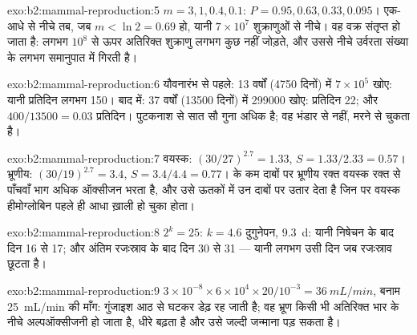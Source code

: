 \begin{solution}{exo:b2:mammal-reproduction:5}
$m = 3, 1, 0.4, 0.1$: $P = 0.95, 0.63, 0.33, 0.095$। एक-आधे से नीचे तब,
जब $m < \ln 2 = 0.69$ हो, यानी $7\times 10^{7}$ शुक्राणुओं से नीचे। वह
वक्र संतृप्त हो जाता है: लगभग $10^{8}$ से ऊपर अतिरिक्त शुक्राणु लगभग कुछ
नहीं जोड़ते, और उससे नीचे उर्वरता संख्या के लगभग समानुपात में गिरती है।
\end{solution}

\begin{solution}{exo:b2:mammal-reproduction:6}
यौवनारंभ से पहले: 13 वर्षों (\num{4750} दिनों) में $7\times 10^{5}$ खोए:
यानी प्रतिदिन लगभग 150। बाद में: 37 वर्षों (\num{13500}
दिनों) में \num{299000} खोए: प्रतिदिन 22; और  $400/\num{13500} = 0.03$
प्रतिदिन। पुटकनाश  से सात सौ गुना अधिक है; वह भंडार
 से नहीं, मरने से चुकता है।
\end{solution}

\begin{solution}{exo:b2:mammal-reproduction:7}
वयस्क: $(30/27)^{2.7} = 1.33$, $S = 1.33/2.33 = 0.57$। भ्रूणीय:
$(30/19)^{2.7} = 3.4$, $S = 3.4/4.4 = 0.77$।  के कम दाबों
पर भ्रूणीय रक्त वयस्क रक्त से पाँचवाँ भाग अधिक ऑक्सीजन
भरता है, और उसे ऊतकों में उन दाबों पर उतार देता है जिन पर वयस्क
हीमोग्लोबिन पहले ही आधा ख़ाली हो चुका होता।
\end{solution}

\begin{solution}{exo:b2:mammal-reproduction:8}
$2^{k} = 25$: $k = 4.6$ दुगुनेपन, \qty{9.3}{d}: यानी निषेचन के बाद दिन
16 से 17; और अंतिम रजःस्राव के बाद दिन 30 से 31 --- यानी लगभग उसी दिन
जब रजःस्राव छूटता है।
\end{solution}

\begin{solution}{exo:b2:mammal-reproduction:9}
$3\times 10^{-8}\times 6\times 10^{4}\times 20/10^{-3} =
\qty{36}{mL/min}$, बनाम \qty{25}{mL/min} की माँग: गुंजाइश
आठ से घटकर डेढ़ रह जाती है; वह भ्रूण किसी भी अतिरिक्त भार के नीचे
अल्पऑक्सीजनी हो जाता है, धीरे बढ़ता है और उसे जल्दी जन्माना पड़ सकता है।
\end{solution}

